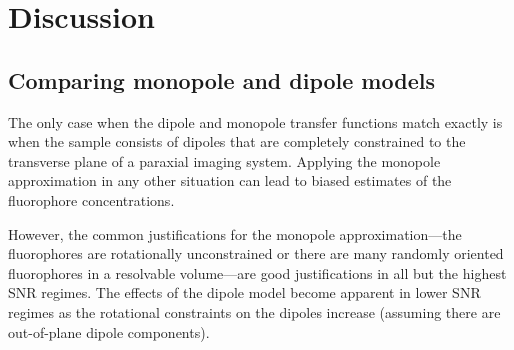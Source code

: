 \documentclass[]{osa-article}
\begin{document}
 \section{Discussion}\label{sec:discussion}
 \subsection{Comparing monopole and dipole models}
 The only case when the dipole and monopole transfer functions match
   exactly is when the sample consists of dipoles that are completely
   constrained to the transverse plane of a paraxial imaging system. Applying
   the monopole approximation in any other situation can lead to biased
   estimates of the fluorophore concentrations.

 However, the common justifications for the monopole approximation---the
   fluorophores are rotationally unconstrained or there are many randomly
   oriented fluorophores in a resolvable volume---are good justifications in all
   but the highest SNR regimes. The effects of the dipole model become apparent
   in lower SNR regimes as the rotational constraints on the dipoles increase
   (assuming there are out-of-plane dipole components).
 


 
\end{document}
